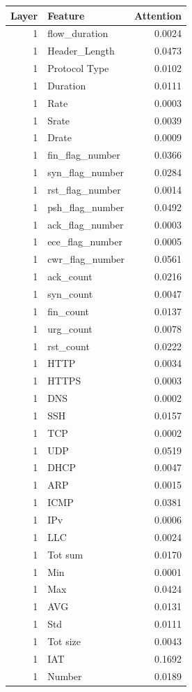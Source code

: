 \begin{tabular}{rlr}
\toprule
Layer & Feature & Attention \\
\midrule
1 & flow\_duration & 0.0024 \\
1 & Header\_Length & 0.0473 \\
1 & Protocol Type & 0.0102 \\
1 & Duration & 0.0111 \\
1 & Rate & 0.0003 \\
1 & Srate & 0.0039 \\
1 & Drate & 0.0009 \\
1 & fin\_flag\_number & 0.0366 \\
1 & syn\_flag\_number & 0.0284 \\
1 & rst\_flag\_number & 0.0014 \\
1 & psh\_flag\_number & 0.0492 \\
1 & ack\_flag\_number & 0.0003 \\
1 & ece\_flag\_number & 0.0005 \\
1 & cwr\_flag\_number & 0.0561 \\
1 & ack\_count & 0.0216 \\
1 & syn\_count & 0.0047 \\
1 & fin\_count & 0.0137 \\
1 & urg\_count & 0.0078 \\
1 & rst\_count & 0.0222 \\
1 & HTTP & 0.0034 \\
1 & HTTPS & 0.0003 \\
1 & DNS & 0.0002 \\
1 & SSH & 0.0157 \\
1 & TCP & 0.0002 \\
1 & UDP & 0.0519 \\
1 & DHCP & 0.0047 \\
1 & ARP & 0.0015 \\
1 & ICMP & 0.0381 \\
1 & IPv & 0.0006 \\
1 & LLC & 0.0024 \\
1 & Tot sum & 0.0170 \\
1 & Min & 0.0001 \\
1 & Max & 0.0424 \\
1 & AVG & 0.0131 \\
1 & Std & 0.0111 \\
1 & Tot size & 0.0043 \\
1 & IAT & 0.1692 \\
1 & Number & 0.0189 \\

\end{tabular}
